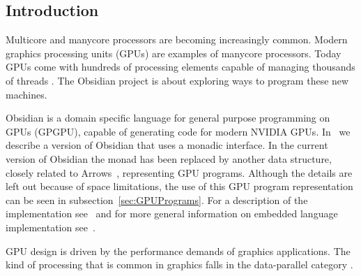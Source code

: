 








\subsection{Introduction} 

Multicore and manycore processors are becoming increasingly common. Modern 
graphics processing units (GPUs) are examples of manycore processors. Today 
GPUs come with hundreds of processing elements capable of managing thousands 
of threads \cite{Brief8800}. The Obsidian project is about exploring ways 
to program these new machines.  

Obsidian is a domain specific language for general purpose programming on 
GPUs (GPGPU), capable of generating code for modern NVIDIA GPUs. 
In~\cite{JSMSKC_IFL08} we describe a version of Obsidian that uses a monadic 
interface. In the current version of Obsidian the monad has been replaced 
by another data structure, closely related to Arrows~\cite{Arrows}, representing GPU programs. Although the details are 
left out because of space limitations, the use of this GPU program representation 
can be seen in subsection~\ref{sec:GPUPrograms}. For a description of the implementation 
see~\cite{JSTECH} and for more general information on embedded language 
implementation see~\cite{COMPILEEDSL}.

GPU design is driven by the performance demands of graphics applications. 
The kind of processing that is common in graphics falls in the data-parallel 
category \cite{GEMS2}.



